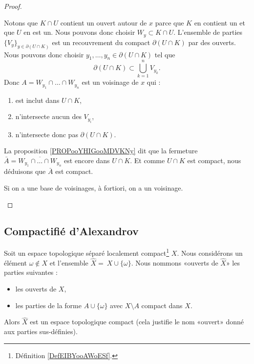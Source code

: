 \begin{proof}
\begin{subproof}
		Notons que \( K\cap U\) contient un ouvert autour de \( x\) parce que \( K\) en contient un et que \( U\) en est un. Nous pouvons donc choisir \( W_y\subset K\cap U\). L'ensemble de parties \( \{ V_y \}_{y\in\partial(U\cap K)}\) est un recouvrement du compact \( \partial(U\cap K)\) par des ouverts. Nous pouvons donc choisir \( y_1,\ldots,y_n\in\partial(U\cap K)\) tel que
		\begin{equation}
			\partial(U\cap K)\subset \bigcup_{k=1}^nV_{y_k}.
		\end{equation}
		Donc \(A= W_{y_1}\cap\ldots\cap W_{y_n}\)  est un voisinage de \( x\) qui :
		\begin{enumerate}
			\item
			      est inclut dans \( U\cap K\),
			\item
			      n'intersecte aucun des \( V_{y_i}\),
			\item
			      n'intersecte donc pas \( \partial(U\cap K)\).
		\end{enumerate}
		La proposition \ref{PROPooYHIGooMDVKNy} dit que la fermeture \(\bar A= \overline{W_{y_1}\cap\ldots \cap W_{y_n}}\) est encore dans \( U\cap K\). Et comme \( U\cap K\) est compact, nous déduisons que \( \bar A\) est compact.

		\spitem[\ref{ITEMooXYYHooTCZMJr} \( \Rightarrow\) \ref{ITEMooBTECooDDsTuo}]
		Si on a une base de voisinages, à fortiori, on a un voisinage.
	\end{subproof}
\end{proof}



\subsection{Compactifié d'Alexandrov}

\begin{propositionDef}       \label{PROPooHNOZooPSzKIN}
	Soit un espace topologique séparé localement compact\footnote{Définition \ref{DefEIBYooAWoESf}.} \( X\). Nous considérons un élément \( \omega\notin X\) et l'ensemble \( \hat X =\ X\cup\{ \omega \}\). Nous nommons «ouverts de \( \hat X\)» les parties suivantes :
	\begin{itemize}
		\item les ouverts de \( X\),
		\item les parties de la forme \( A\cup\{ \omega \}\) avec \( X\setminus A\) compact dans \( X\).
	\end{itemize}
	Alors \( \hat X\) est un espace topologique compact (cela justifie le nom «ouvert» donné aux parties sus-définies).
\end{propositionDef}

